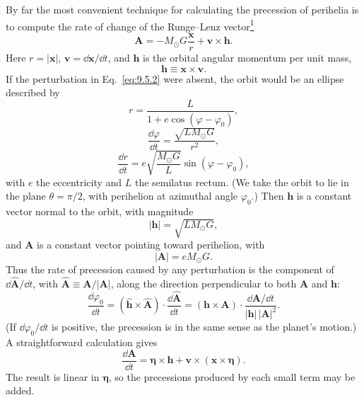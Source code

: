 By far the most convenient technique for calculating the precession of
perihelia is to compute the rate of change of the Runge--Lenz
vector\hyperref[ch9-ref-1]{\textsuperscript{1}}
\begin{equation}
  \mathbf A
  =
  -M_\odot G\frac{\mathbf x}{r}
  +\mathbf v\times\mathbf h.
  \tag{9.5.4}\label{eq:9.5.4}
\end{equation}
Here \(r=|\mathbf x|\), \(\mathbf v=\dd\mathbf x/\dd t\), and
\(\mathbf h\) is the orbital angular momentum per unit mass,
\begin{equation}
  \mathbf h\equiv\mathbf x\times\mathbf v.
  \tag{9.5.5}\label{eq:9.5.5}
\end{equation}
If the perturbation in Eq.~\eqref{eq:9.5.2} were absent, the orbit would
be an ellipse described by
\begin{equation}
  r=\frac{L}{1+e\cos(\varphi-\varphi_0)},
  \tag{9.5.6}\label{eq:9.5.6}
\end{equation}
\begin{equation}
  \frac{\dd\varphi}{\dd t}
  =
  \frac{\sqrt{LM_\odot G}}{r^2},
  \tag{9.5.7}\label{eq:9.5.7}
\end{equation}
\begin{equation}
  \frac{\dd r}{\dd t}
  =
  e\sqrt{\frac{M_\odot G}{L}}
  \sin(\varphi-\varphi_0),
  \tag{9.5.8}\label{eq:9.5.8}
\end{equation}
with \(e\) the eccentricity and \(L\) the semilatus rectum. (We take the
orbit to lie in the plane \(\theta=\pi/2\), with perihelion at azimuthal
angle \(\varphi_0\).) Then \(\mathbf h\) is a constant vector normal to the
orbit, with magnitude
\begin{equation}
  |\mathbf h|=\sqrt{LM_\odot G},
  \tag{9.5.9}\label{eq:9.5.9}
\end{equation}
and \(\mathbf A\) is a constant vector pointing toward perihelion, with
\begin{equation}
  |\mathbf A|=eM_\odot G.
  \tag{9.5.10}\label{eq:9.5.10}
\end{equation}
Thus the rate of precession caused by any perturbation is the component of
\(\dd\widehat{\mathbf A}/\dd t\), with
\(\widehat{\mathbf A}\equiv\mathbf A/|\mathbf A|\), along the direction
perpendicular to both \(\mathbf A\) and \(\mathbf h\):
\begin{equation}
  \frac{\dd\varphi_0}{\dd t}
  =
  (\widehat{\mathbf h}\times\widehat{\mathbf A})
  \cdot\frac{\dd\widehat{\mathbf A}}{\dd t}
  =
  (\mathbf h\times\mathbf A)
  \cdot\frac{\dd\mathbf A/\dd t}
  {|\mathbf h|\,|\mathbf A|^2}.
  \tag{9.5.11}\label{eq:9.5.11}
\end{equation}
(If \(\dd\varphi_0/\dd t\) is positive, the precession is in the same
sense as the planet's motion.) A straightforward calculation gives
\begin{equation}
  \frac{\dd\mathbf A}{\dd t}
  =
  \boldsymbol\eta\times\mathbf h
  +\mathbf v\times(\mathbf x\times\boldsymbol\eta).
  \tag{9.5.12}\label{eq:9.5.12}
\end{equation}
The result is linear in \(\boldsymbol\eta\), so the precessions produced by
each small term may be added.

